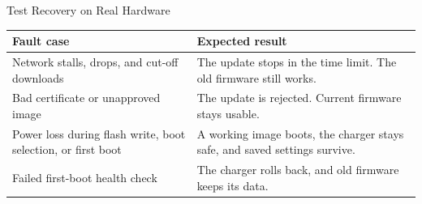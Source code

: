 \documentclass[aspectratio=169,11pt]{beamer}
\begin{document}
    \begin{frame}[label=ota-hardware]{Test Recovery on Real Hardware}
        \begingroup
        \setlength{\aboverulesep}{0pt}
        \setlength{\belowrulesep}{0pt}
        \renewcommand{\arraystretch}{1.12}
        \footnotesize
        \begin{tabularx}{\textwidth}{ >{\raggedright\arraybackslash}p{} >{\raggedright\arraybackslash}X }
    \toprule
    \rowcolor{Ink!10}
    \textbf{Fault case} & \textbf{Expected result}                                                   \\
    \midrule
    Network stalls, drops, and cut-off downloads
    & The update stops in the time limit. The old firmware still works.          \\
    \rowcolor{RowTint}
    Bad certificate or unapproved image
    & The update is rejected. Current firmware stays usable.                     \\
    Power loss during flash write, boot selection, or first boot
    & A working image boots, the charger stays safe, and saved settings survive. \\
    \rowcolor{RowTint}
    Failed first-boot health check
    & The charger rolls back, and old firmware keeps its data.                   \\
    \bottomrule
        \end{tabularx}
        \endgroup
    \end{frame}
\end{document}
